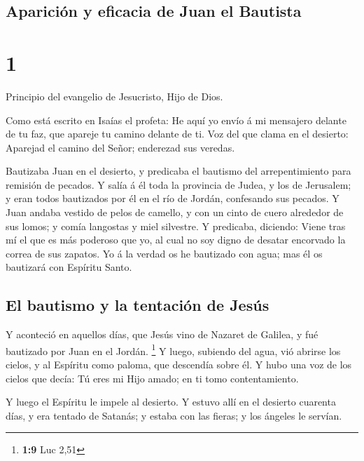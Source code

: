 \hypertarget{apariciuxf3n-y-eficacia-de-juan-el-bautista}{%
\subsection{Aparición y eficacia de Juan el
Bautista}\label{apariciuxf3n-y-eficacia-de-juan-el-bautista}}

\hypertarget{section}{%
\section{1}\label{section}}

 Principio del evangelio de Jesucristo, Hijo de Dios.

 Como está escrito en Isaías el profeta: He aquí yo envío
á mi mensajero delante de tu faz, que apareje tu camino delante de ti.
 Voz del que clama en el desierto: Aparejad el camino del
Señor; enderezad sus veredas.

 Bautizaba Juan en el desierto, y predicaba el bautismo
del arrepentimiento para remisión de pecados.  Y salía á
él toda la provincia de Judea, y los de Jerusalem; y eran todos
bautizados por él en el río de Jordán, confesando sus pecados.
 Y Juan andaba vestido de pelos de camello, y con un cinto
de cuero alrededor de sus lomos; y comía langostas y miel silvestre.
 Y predicaba, diciendo: Viene tras mí el que es más
poderoso que yo, al cual no soy digno de desatar encorvado la correa de
sus zapatos.  Yo á la verdad os he bautizado con agua; mas
él os bautizará con Espíritu Santo.

\hypertarget{el-bautismo-y-la-tentaciuxf3n-de-jesuxfas}{%
\subsection{El bautismo y la tentación de
Jesús}\label{el-bautismo-y-la-tentaciuxf3n-de-jesuxfas}}

 Y aconteció en aquellos días, que Jesús vino de Nazaret
de Galilea, y fué bautizado por Juan en el Jordán. \footnote{\textbf{1:9}
  Luc 2,51}  Y luego, subiendo del agua, vió abrirse los
cielos, y al Espíritu como paloma, que descendía sobre él.
 Y hubo una voz de los cielos que decía: Tú eres mi Hijo
amado; en ti tomo contentamiento.

 Y luego el Espíritu le impele al desierto.
 Y estuvo allí en el desierto cuarenta días, y era
tentado de Satanás; y estaba con las fieras; y los ángeles le servían.

